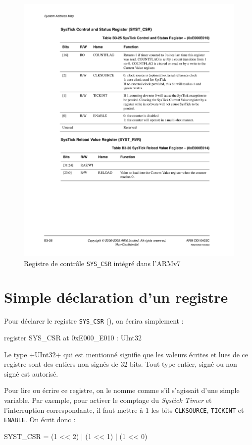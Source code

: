 \begin{figure}[t]
\centering
\includegraphics{chapitres/arm-v7-systick.pdf}
\caption{Registre de contrôle \texttt{SYS\_CSR} intégré dans l'ARMv7}
\ligne
\end{figure}




\section{Simple déclaration d'un registre}
Pour déclarer le registre \texttt{SYS\_CSR} (), on écrira simplement :
\begin{PLM}
register SYS_CSR at 0xE000_E010 : UInt32
\end{PLM}

Le type \plm+UInt32+ qui est mentionné signifie que les valeurs écrites et lues de ce registre sont des entiers non signés de 32 bits. Tout type entier, signé ou non signé est autorisé.

Pour lire ou écrire ce registre, on le nomme comme s'il s'agissait d'une simple variable. Par exemple, pour activer le comptage du \emph{Systick Timer} et l'interruption correspondante, il faut mettre à $1$ les bits \texttt{CLKSOURCE}, \texttt{TICKINT} et \texttt{ENABLE}. On écrit donc :
\begin{PLM}
SYST_CSR = (1 << 2) | (1 << 1) | (1 << 0)
\end{PLM}

